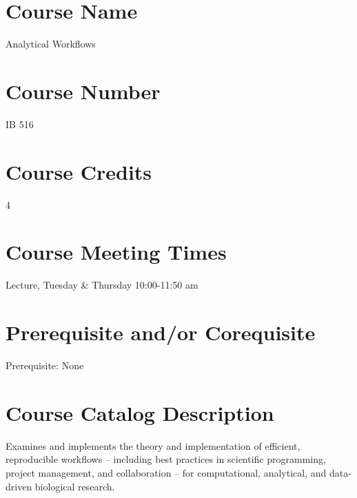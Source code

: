 \documentclass[10pt]{article}
\begin{document}



\section*{Course Name}
Analytical Workflows

\section*{Course Number}
 IB 516

\section*{Course Credits}
4

\section*{Course Meeting Times}
Lecture, Tuesday \& Thursday 10:00-11:50 am

\section*{Prerequisite and/or Corequisite}
Prerequisite: None

\section*{Course Catalog Description}
Examines and implements the theory and implementation of efficient, reproducible workflows -- 
including best practices in scientific programming, project management, and collaboration --  for 
computational, analytical, and data-driven biological research.
\end{document}
